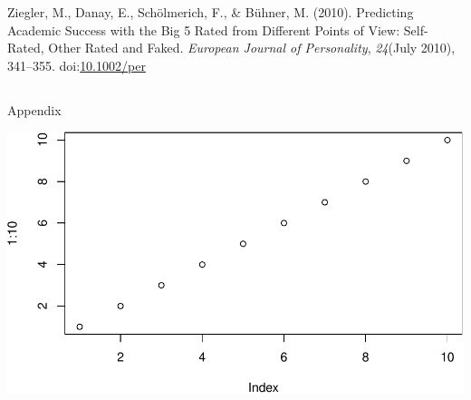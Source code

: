 \documentclass[floatsintext,man]{apa6}
\theoremstyle{definition}
\theoremstyle{definition}
\theoremstyle{definition}
\theoremstyle{remark}
\begin{document}
\leavevmode\hypertarget{ref-Ziegler2010}{}%
Ziegler, M., Danay, E., Schölmerich, F., \& Bühner, M. (2010).
Predicting Academic Success with the Big 5 Rated from Different Points
of View: Self-Rated, Other Rated and Faked. \emph{European Journal of
Personality}, \emph{24}(July 2010), 341--355.
doi:\href{https://doi.org/10.1002/per}{10.1002/per}

\endgroup


\clearpage
\renewcommand{\listtablename}{Table captions}
\listoftables



  \clearpage
  \makeatletter
  \efloat@restorefloats
  \makeatother
  
  
\begin{appendix}
\section{}
Appendix

\includegraphics{IPIP_draft_files/figure-latex/unnamed-chunk-3-1.pdf}
\end{appendix}
\end{document}

